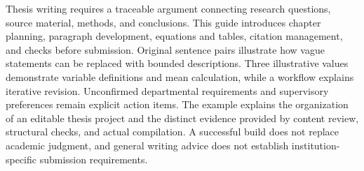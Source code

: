 \begin{abstract}
学位论文写作需要把研究问题、材料、方法和结论组织成可追溯的论证。本指南围绕这一过程，介绍章节规划、段落组织、公式与图表表达、引用管理以及提交前自查。指南通过原创对照句说明如何将含糊表述改为边界明确的文字，以三个教学数值展示变量定义和均值计算，并给出逐步修订的流程。对于院系要求和导师意见等尚未确认的信息，指南保留明确的待办标记。示例旨在帮助读者理解可编辑论文工程的组织方式，以及内容审阅、结构检查和真实编译各自能够提供的证据。它不以编译成功代替学术判断，也不把通用建议视为具体学校的提交规范。
\end{abstract}

\begin{abstract*}
Thesis writing requires a traceable argument connecting research questions, source material, methods, and conclusions. This guide introduces chapter planning, paragraph development, equations and tables, citation management, and checks before submission. Original sentence pairs illustrate how vague statements can be replaced with bounded descriptions. Three illustrative values demonstrate variable definitions and mean calculation, while a workflow explains iterative revision. Unconfirmed departmental requirements and supervisory preferences remain explicit action items. The example explains the organization of an editable thesis project and the distinct evidence provided by content review, structural checks, and actual compilation. A successful build does not replace academic judgment, and general writing advice does not establish institution-specific submission requirements.
\end{abstract*}
